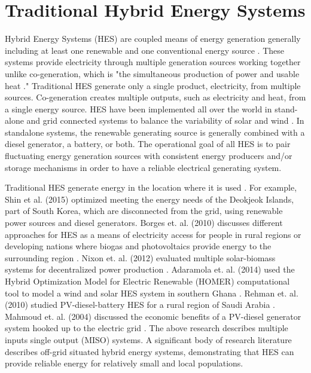 \documentclass[12pt]{UIdahoMastersThesis}
\begin{document}
\section{Traditional Hybrid Energy Systems}
Hybrid Energy Systems (HES) are coupled means of energy generation generally including at least one renewable and one conventional energy source \cite {Ibrahim2011}. These systems provide electricity through multiple generation sources working together unlike co-generation, which is "the simultaneous production of power and usable heat \cite{Rosen2005}." Traditional HES generate only a single product, electricity, from multiple sources. Co-generation creates multiple outputs, such as electricity and heat, from a single energy source. HES have been implemented all over the world in stand-alone and grid connected systems to balance the variability of solar and wind \cite {Garcia2015, Qi2014, Shin2015, Nixon2012, Adaramola2014, Goodbody2013, BorgesNeto2010, McGowan1996}. In standalone systems, the renewable generating source is generally combined with a diesel generator, a battery, or both. The operational goal of all HES is to pair fluctuating energy generation sources with consistent energy producers and/or storage mechanisms in order to have a reliable electrical generating system.

Traditional HES generate energy in the location where it is used \cite {Shin2015, Nixon2012, Adaramola2014, Goodbody2013, McGowan1996}. For example, Shin et al. (2015) optimized meeting the energy needs of the Deokjeok Islands, part of South Korea, which are disconnected from the grid, using renewable power sources and diesel generators. Borges et. al. (2010) discusses different approaches for HES as a means of electricity access for people in rural regions or developing nations where biogas and photovoltaics provide energy to the surrounding region \cite{BorgesNeto2010}. Nixon et. al. (2012) evaluated multiple solar-biomass systems for decentralized power production \cite{Nixon2012}. Adaramola et. al. (2014) used the Hybrid Optimization Model for Electric Renewable (HOMER) computational tool to model a wind and solar HES system in southern Ghana \cite{Adaramola2014}. Rehman et. al. (2010) studied PV-diesel-battery HES for a rural region of Saudi Arabia \cite{Rehman2010}. Mahmoud et. al. (2004) discussed the economic benefits of a PV-diesel generator system hooked up to the electric grid \cite {Mahmoud2004}. The above research describes multiple inputs single output (MISO) systems\cite{Garcia2013}. A significant body of research literature describes off-grid situated hybrid energy systems, demonstrating that HES can provide reliable energy for relatively small and local populations.
\end{document}
